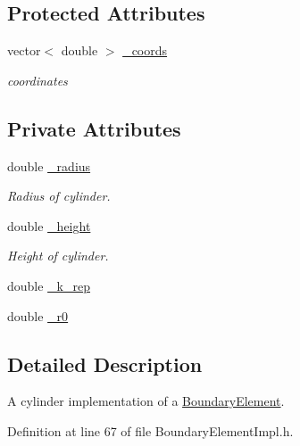 \subsection*{Protected Attributes}
\begin{DoxyCompactItemize}
\item 
vector$<$ double $>$ \hyperlink{classBoundaryElement_ab51302e10e3e2def98438234ba5bf801}{\+\_\+coords}
\begin{DoxyCompactList}\small\item\em coordinates \end{DoxyCompactList}\end{DoxyCompactItemize}
\subsection*{Private Attributes}
\begin{DoxyCompactItemize}
\item 
double \hyperlink{classCylindricalZBoundaryElement_a09b2855b82606ae98f56e70eca516873}{\+\_\+radius}
\begin{DoxyCompactList}\small\item\em Radius of cylinder. \end{DoxyCompactList}\item 
double \hyperlink{classCylindricalZBoundaryElement_a5227f1150dc1a7dc212cfd4387e523fc}{\+\_\+height}
\begin{DoxyCompactList}\small\item\em Height of cylinder. \end{DoxyCompactList}\item 
double \hyperlink{classCylindricalZBoundaryElement_a4cdd06d2f2f1ac84e0ef6872c812b6cc}{\+\_\+k\+\_\+rep}
\item 
double \hyperlink{classCylindricalZBoundaryElement_a62b5ad9130b1cdeaa17ea3beaad760ef}{\+\_\+r0}
\end{DoxyCompactItemize}


\subsection{Detailed Description}
A cylinder implementation of a \hyperlink{classBoundaryElement}{Boundary\+Element}. 

Definition at line 67 of file Boundary\+Element\+Impl.\+h.



